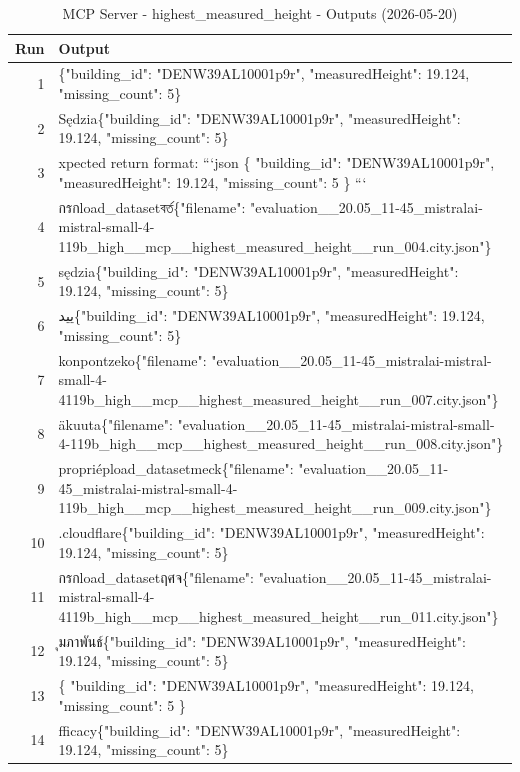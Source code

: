 \documentclass[a4paper,11pt]{article}
\begin{document}
\clearpage

\begin{table}[ht]
\centering
\scriptsize
\caption{MCP Server - highest\_measured\_height - Outputs (2026-05-20)}
\label{tab:mcp\_highest\_measured\_height\_outputs\_2026-05-20}
\begin{tabular}{r p{12cm}}
\hline
Run & Output \\
\hline
1 & \{"building\_id": "DENW39AL10001p9r", "measuredHeight": 19.124, "missing\_count": 5\} \\
2 & Sędzia\{"building\_id": "DENW39AL10001p9r", "measuredHeight": 19.124, "missing\_count": 5\} \\
3 & xpected return format:
```json
\{
  "building\_id": "DENW39AL10001p9r",
  "measuredHeight": 19.124,
  "missing\_count": 5
\}
``` \\
4 &  กรกload\_datasetবর্ত\{"filename": "evaluation\_\_20.05\_11-45\_mistralai-mistral-small-4-119b\_high\_\_mcp\_\_highest\_measured\_height\_\_run\_004.city.json"\} \\
5 & sędzia\{"building\_id": "DENW39AL10001p9r", "measuredHeight": 19.124, "missing\_count": 5\} \\
6 & یید\{"building\_id": "DENW39AL10001p9r", "measuredHeight": 19.124, "missing\_count": 5\} \\
7 &  konpontzeko\{"filename": "evaluation\_\_20.05\_11-45\_mistralai-mistral-small-4-4119b\_high\_\_mcp\_\_highest\_measured\_height\_\_run\_007.city.json"\} \\
8 & äkuuta\{"filename": "evaluation\_\_20.05\_11-45\_mistralai-mistral-small-4-119b\_high\_\_mcp\_\_highest\_measured\_height\_\_run\_008.city.json"\} \\
9 &  propriépload\_datasetmeck\{"filename": "evaluation\_\_20.05\_11-45\_mistralai-mistral-small-4-119b\_high\_\_mcp\_\_highest\_measured\_height\_\_run\_009.city.json"\} \\
10 & .cloudflare\{"building\_id": "DENW39AL10001p9r", "measuredHeight": 19.124, "missing\_count": 5\} \\
11 &  กรกload\_datasetฤศจ\{"filename": "evaluation\_\_20.05\_11-45\_mistralai-mistral-small-4-4119b\_high\_\_mcp\_\_highest\_measured\_height\_\_run\_011.city.json"\} \\
12 & ุมภาพันธ์\{"building\_id": "DENW39AL10001p9r", "measuredHeight": 19.124, "missing\_count": 5\} \\
13 & \{
  "building\_id": "DENW39AL10001p9r",
  "measuredHeight": 19.124,
  "missing\_count": 5
\} \\
14 & fficacy\{"building\_id": "DENW39AL10001p9r", "measuredHeight": 19.124, "missing\_count": 5\} \\

\end{tabular}
\end{table}
\end{document}
